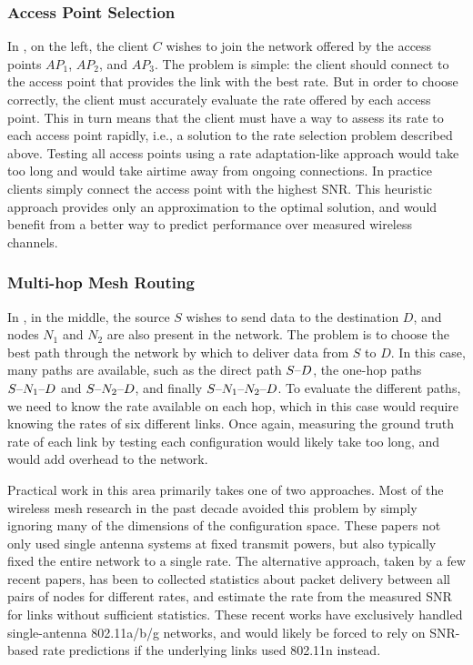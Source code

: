 \subsubsection{Access Point Selection}
In , on the left, the client $C$ wishes to join the network offered by the access points $AP_1$, $AP_2$, and $AP_3$. The  problem is simple: the client should connect to the access point that provides the link with the best rate. But in order to choose correctly, the client must accurately evaluate the rate offered by each access point. This in turn means that the client must have a way to assess its rate to each access point rapidly, i.e., a solution to the rate selection problem described above. Testing all access points using a rate adaptation-like approach would take too long and would take airtime away from ongoing connections. In practice clients simply connect the access point with the highest SNR\@. This heuristic approach provides only an approximation to the optimal solution, and would benefit from a better way to predict performance over measured wireless channels.

\subsubsection{Multi-hop Mesh Routing}
In , in the middle, the source $S$ wishes to send data to the destination $D$, and nodes $N_1$ and $N_2$ are also present in the network. The  problem is to choose the best path through the network by which to deliver data from $S$ to $D$. In this case, many paths are available, such as the direct path $S\textnormal{--} D$, the one-hop paths $S\textnormal{--} N_1\textnormal{--} D$ and $S\textnormal{--} N_2\textnormal{--} D$, and finally $S\textnormal{--} N_1\textnormal{--} N_2\textnormal{--} D$. To evaluate the different paths, we need to know the rate available on each hop, which in this case would require knowing the rates of six different links. Once again, measuring the ground truth rate of each link by testing each configuration would likely take too long, and would add overhead to the network.

Practical work in this area primarily takes one of two approaches. Most of the wireless mesh research in the past decade avoided this problem by simply ignoring many of the dimensions of the configuration space. These papers not only used single antenna systems at fixed transmit powers, but also typically fixed the entire network to a single rate. The alternative approach, taken by a few recent papers, has been to collected statistics about packet delivery between all pairs of nodes for different rates, and estimate the rate from the measured SNR for links without sufficient statistics. These recent works have exclusively handled single-antenna 802.11a/b/g networks, and would likely be forced to rely on SNR-based rate predictions if the underlying links used 802.11n instead.

